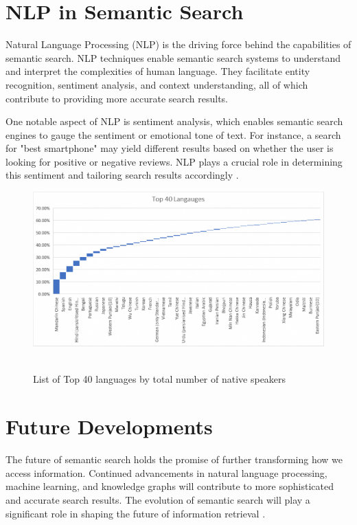 \documentclass[10pt,oneside,a4paper]{article}
\begin{document}
\section{NLP in Semantic Search}
Natural Language Processing (NLP) is the driving force behind the capabilities of semantic search. NLP techniques enable semantic search systems to understand and interpret the complexities of human language. They facilitate entity recognition, sentiment analysis, and context understanding, all of which contribute to providing more accurate search results.

One notable aspect of NLP is sentiment analysis, which enables semantic search engines to gauge the sentiment or emotional tone of text. For instance, a search for "best smartphone" may yield different results based on whether the user is looking for positive or negative reviews. NLP plays a crucial role in determining this sentiment and tailoring search results accordingly \cite{Jurafsky2020}.

\begin{figure}[h]
\centering
\includegraphics[scale=0.6]{NLP.png}\
\caption{List of Top 40 languages by total number of native speakers}
\end{figure}

\section{Future Developments}
The future of semantic search holds the promise of further transforming how we access information. Continued advancements in natural language processing, machine learning, and knowledge graphs will contribute to more sophisticated and accurate search results. The evolution of semantic search will play a significant role in shaping the future of information retrieval \cite{Jurafsky2020}.
\end{document}
